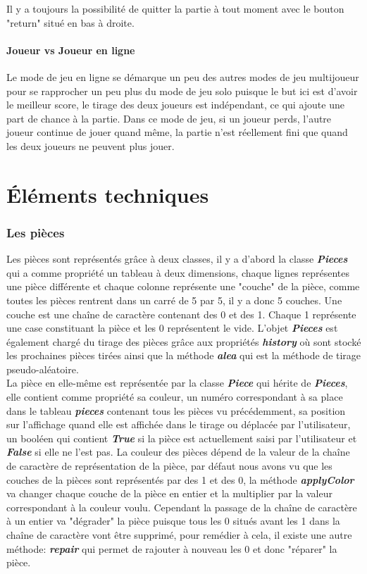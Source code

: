 \documentclass[a4paper]{report}
\begin{document}
Il y a toujours la possibilité de quitter la partie à tout moment avec le bouton "return" situé en bas à droite.
\subsection{Joueur vs Joueur en ligne}
Le mode de jeu en ligne se démarque un peu des autres modes de jeu multijoueur pour se rapprocher un peu plus du mode de jeu solo puisque le but ici est d'avoir le meilleur score, le tirage des deux joueurs est indépendant, ce qui ajoute une part de chance à la partie. Dans ce mode de jeu, si un joueur perds, l'autre joueur continue de jouer quand même, la partie n'est réellement fini que quand les deux joueurs ne peuvent plus jouer.


\part{Éléments techniques}

\section{Les pièces}
Les pièces sont représentés grâce à deux classes, il y a d'abord la classe \textbf{\textit{Pieces}} qui a comme propriété un tableau à deux dimensions, chaque lignes représentes une pièce différente et chaque colonne représente une "couche" de la pièce, comme toutes les pièces rentrent dans un carré de 5 par 5, il y a donc 5 couches. Une couche est une chaîne de caractère contenant des 0 et des 1. Chaque 1 représente une case constituant la pièce et les 0 représentent le vide. L'objet \textbf{\textit{Pieces}} est également chargé du tirage des pièces grâce aux propriétés \textbf{\textit{history}} où sont stocké les prochaines pièces tirées ainsi que la méthode \textbf{\textit{alea}} qui est la méthode de tirage pseudo-aléatoire. \\

La pièce en elle-même est représentée par la classe \textbf{\textit{Piece}} qui hérite de \textbf{\textit{Pieces}}, elle contient comme propriété sa couleur, un numéro correspondant à sa place dans le tableau \textbf{\textit{pieces}} contenant tous les pièces vu précédemment, sa position sur l'affichage quand elle est affichée dans le tirage ou déplacée par l'utilisateur, un booléen qui contient \textbf{\textit{True}} si la pièce est actuellement saisi par l'utilisateur et \textbf{\textit{False}} si elle ne l'est pas. La couleur des pièces dépend de la valeur de la chaîne de caractère de représentation de la pièce, par défaut nous avons vu que les couches de la pièces sont représentés par des 1 et des 0, la méthode \textbf{\textit{applyColor}} va changer chaque couche de la pièce en entier et la multiplier par la valeur correspondant à la couleur voulu. Cependant la passage de la chaîne de caractère à un entier va "dégrader" la pièce puisque tous les 0 situés avant les 1 dans la chaîne de caractère vont être supprimé, pour remédier à cela, il existe une autre méthode: \textbf{\textit{repair}} qui permet de rajouter à nouveau les 0 et donc "réparer" la pièce.
\end{document}
